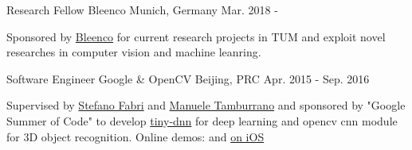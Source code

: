 


\begin{cventries}


\cventry
{Research Fellow} %
{Bleenco} %
{Munich, Germany} %
{Mar. 2018 - } %
{ %
\begin{cvitems}
\item {Sponsored by \href{https://www.linkedin.com/in/irmanabdic/?originalSubdomain=de}{Bleenco} for current research projects in TUM and exploit novel researches in computer vision and machine leanring.}
\end{cvitems}
}

\cventry
{Software Engineer} %
{Google \& OpenCV} %
{Beijing, PRC} %
{Apr. 2015 - Sep. 2016} %
{ %
\begin{cvitems}
\item {Supervised by \href{https://www.linkedin.com/in/stefano-fabri-16a73748}{Stefano Fabri} and \href{https://www.linkedin.com/in/manuele-tamburrano-b82384a5?authType=name&authToken=Di5p&trk=prof-sb-browse_map-name}{Manuele Tamburrano} and sponsored by "Google Summer of Code" to develop \href{https://github.com/tiny-dnn/tiny-dnn}{tiny-dnn} for deep learning and opencv cnn module for 3D object recognition.
		Online demos: \href{https://www.youtube.com/watch?v=Mc20rTYdXTE}{\color{blue}{3D Multi-task Learning}} and \href{https://drive.google.com/open?id=0B-RYa1FDOrYXVUEzcG1mdnl5a3M}{\color{blue}{tiny-dnn} on iOS}
}
\end{cvitems}
}


\end{cventries}
